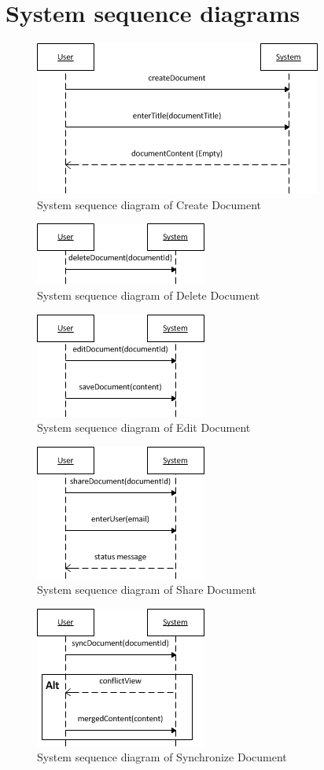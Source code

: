 \documentclass[a4paper,11pt,report]{report}
\begin{document}
\section{System sequence diagrams}
\begin{figure}[H]
  \centering
\includegraphics[]{./createdocumentssd}
\caption{System sequence diagram of Create Document}
\end{figure}
\begin{figure}[H]
  \centering
\includegraphics[]{./deleteDocument}
\caption{System sequence diagram of Delete Document}
\end{figure}
\begin{figure}[H]
  \centering
\includegraphics[]{./editdocumentssd}
\caption{System sequence diagram of Edit Document}
\end{figure}
\begin{figure}[H]
  \centering
\includegraphics[]{./sharedocument}
\caption{System sequence diagram of Share Document}
\end{figure}
\begin{figure}[H]
  \centering
\includegraphics[]{./syncDocument}
\caption{System sequence diagram of Synchronize Document}
\end{figure}
\end{document}
